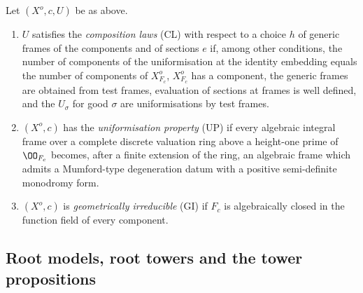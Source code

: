 \begin{definition}\label{def:pf:deepstr:unifconditions}
Let $(X^o,c,U)$ be as above.
\begin{enumerate}[label=(\alph*)]
\item $U$ satisfies the \emph{composition laws} (CL) with respect to a choice $h$ of generic frames of the
components and of sections $e$ if, among other conditions, the number of components of the uniformisation at
the identity embedding equals the number of components of $X^o_{F_c}$, $X^o_{F_c}$ has a component, the generic
frames are obtained from test frames, evaluation of sections at frames is well defined, and the $U_\sigma$ for
good $\sigma$ are uniformisations by test frames.
\item $(X^o,c)$ has the \emph{uniformisation property} (UP) if every algebraic integral frame over a
complete discrete valuation ring above a height-one prime of $\OO_{F_c}$ becomes, after a finite extension of
the ring, an algebraic frame which admits a Mumford-type degeneration datum with a positive semi-definite
monodromy form.
\item $(X^o,c)$ is \emph{geometrically irreducible} (GI) if $F_c$ is algebraically closed in the function
field of every component.
\end{enumerate}
\end{definition}

\subsection{Root models, root towers and the tower propositions}\label{sec:pf:deepstr:towers}

